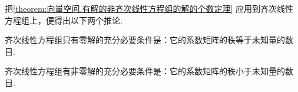 把\cref{theorem:向量空间.有解的非齐次线性方程组的解的个数定理}
应用到齐次线性方程组上，便得出以下两个推论.

\begin{corollary}
齐次线性方程组只有零解的充分必要条件是：它的系数矩阵的秩等于未知量的数目.
\end{corollary}

\begin{corollary}\label{theorem:线性方程组.齐次线性方程组有非零解的充分必要条件}
齐次线性方程组有非零解的充分必要条件是：它的系数矩阵的秩小于未知量的数目.
\end{corollary}
